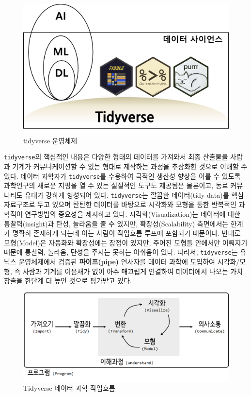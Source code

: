 \documentclass[smallextended]{svjour3}       %
\begin{document}
\begin{figure}

{\centering \includegraphics[width=1\linewidth]{fig/tidyvese_os} 

}

\caption{tidyverse 운영체제}\label{fig:paradigm-tidyverse}
\end{figure}

\texttt{tidyverse}의 핵심적인 내용\cite{wickham2019welcome}은 다양한
형태의 데이터를 가져와서 최종 산출물을 사람과 기계가 커뮤니케이션할 수
있는 형태로 제작하는 과정을 추상화한 것으로 이해할 수 있다. 데이터
과학자가 \texttt{tidyverse}를 수용하여 극적인 생산성 향상을 이룰 수
있도록 과학연구의 새로운 지평을 열 수 있는 실질적인 도구도 제공됨은
물론이고, 동료 커뮤니티도 유대가 강하게 형성되어 있다.
\texttt{tidyverse}는 깔끔한 데이터(tidy data)를 핵심 자료구조로 두고
있으며 탄탄한 데이터를 바탕으로 시각화와 모형을 통한 반복적인 과학적이
연구방법의 중요성을 제시하고 있다. 시각화(Visualization)는 데이터에 대한
통찰력(insight)과 탄성, 놀라움을 줄 수 있지만, 확장성(Scalability)
측면에서는 한계가 명확히 존재하게 되는데 이는 사람이 작업흐름 루프에
포함되기 때문이다. 반대로 모형(Model)은 자동화와 확장성에는 장점이
있지만, 주어진 모형틀 안에서만 이뤄지기 때문에 통찰력, 놀라움, 탄성을
주지는 못하는 아쉬움이 있다. 따라서, \texttt{tidyverse}는 유닉스
운영체제에서 검증된 \textbf{파이프(pipe)} 연사자를 데이터 과학에
도입하여 시각화/모형, 즉 사람과 기계를 이음새가 없이 아주 매끄럽게
연결하여 데이터에서 나오는 가치 창출을 한단계 더 높인 것으로 평가받고
있다.

\begin{figure}

{\centering \includegraphics[width=1\linewidth]{fig/maso_tidyverse} 

}

\caption{Tidyverse 데이터 과학 작업흐름}\label{fig:paradigm-tidyverse-workflow}
\end{figure}
\end{document}
